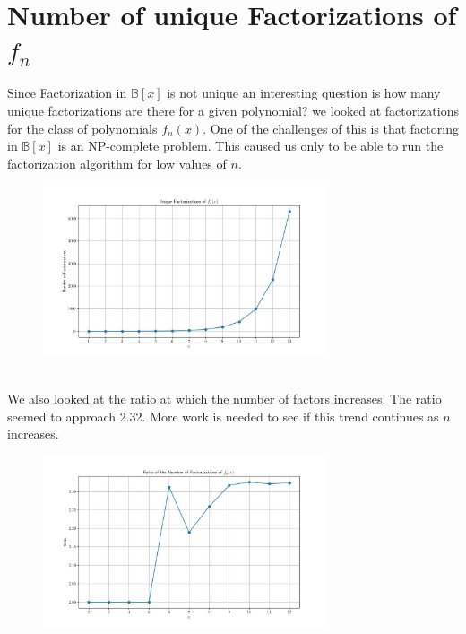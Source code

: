 \documentclass{article}
\newcommand{\B}{\mathbb{B}}
\begin{document}
    \section{Number of unique Factorizations of $f_n$}
    Since Factorization in $\B[x]$ is not unique an interesting question is how many  unique factorizations are there for a given polynomial?
    we looked at factorizations for the class of polynomials $f_n(x)$.
    One of the challenges of this is that factoring in $\B[x]$ is an NP-complete problem.
    This caused us only to be able to run the factorization algorithm for low values of $n$.
    \begin{figure}[h!]
        \centering
        \includegraphics[width=0.75\textwidth]{factorization.jpg}
    \end{figure}
    \\
    We also looked at the ratio at which the number of factors increases. The ratio seemed to approach 2.32.
    More work is needed to see if this trend continues as $n$ increases.
    \begin{figure}[h!]
        \centering
        \includegraphics[width=0.75\textwidth]{ratio.jpg}
    \end{figure}
\end{document}
